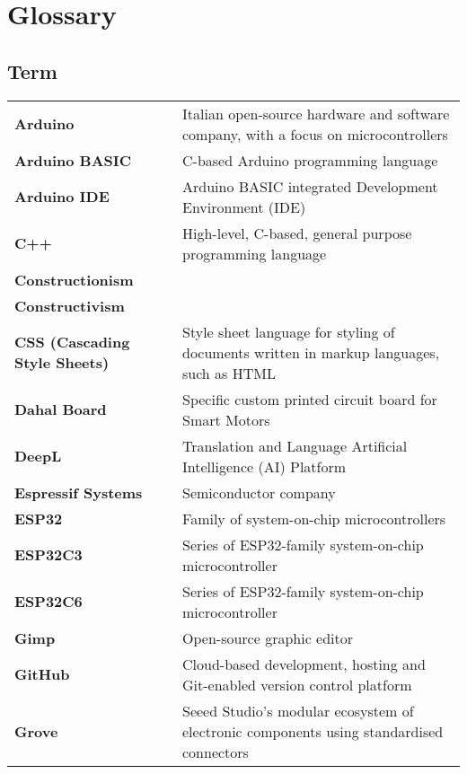 \newpage%
\clearpage%
\chapter*{Glossary}%
%
%
%

\section*{\hspace{0pt}Term \hspace{111pt}{Definition}}%
{\renewcommand{\arraystretch}{1.5} \renewcommand{\tabcolsep}{0.cm}
\begin{longtable}{>{\raggedright \bfseries}p{} p{}}
Arduino             & Italian open-source hardware and software company, with a focus on microcontrollers \\
Arduino BASIC       & C-based Arduino programming language \\
Arduino IDE         & Arduino BASIC integrated Development Environment (IDE) \\
C++                 & High-level, C-based, general purpose programming language \\
Constructionism     & \\
Constructivism      & \\
CSS (Cascading Style Sheets)    & Style sheet language for styling of documents written in markup languages, such as HTML \\
Dahal Board         & Specific custom printed circuit board for Smart Motors \\
DeepL               & Translation and Language Artificial Intelligence (AI) Platform \\
Espressif Systems   & Semiconductor company \\
ESP32               & Family of system-on-chip microcontrollers \\
ESP32C3             & Series of ESP32-family system-on-chip microcontroller \\
ESP32C6             & Series of ESP32-family system-on-chip microcontroller \\
Gimp                & Open-source graphic editor \\
GitHub              & Cloud-based development, hosting and Git-enabled version control platform \\
Grove               & Seeed Studio's modular ecosystem of electronic components using standardised connectors \\

\end{longtable}}
